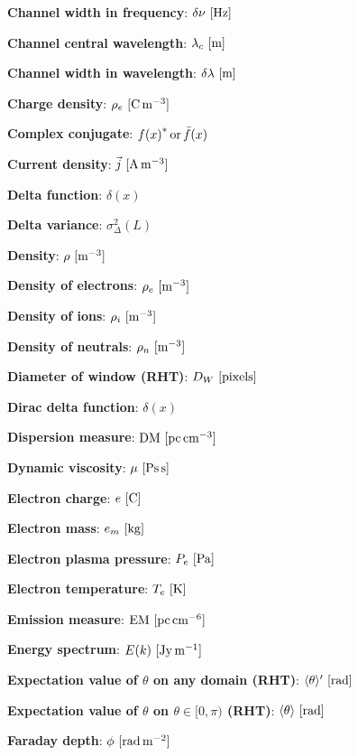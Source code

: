 \documentclass[a4paper,10pt]{article}
\begin{document}
{\noindent}\textbf{Channel width in frequency}: $\delta\nu~[{\rm Hz}]$

{\noindent}\textbf{Channel central wavelength}: $\lambda_c~[{\rm m}]$

{\noindent}\textbf{Channel width in wavelength}: $\delta\lambda~[{\rm m}]$

{\noindent}\textbf{Charge density}: $\rho_e~[{\rm C\,m^{-3}}]$

{\noindent}\textbf{Complex conjugate}: ${f(x)}^*\,{\rm or}\,\bar{f}(x)$

{\noindent}\textbf{Current density}: $\vec{j} ~ [{\rm A\,m^{-3}}]$

{\noindent}\textbf{Delta function}: $\delta (x)$

{\noindent}\textbf{Delta variance}: $\sigma_\Delta^2(L)$

{\noindent}\textbf{Density}: $\rho~[{\rm m^{-3}}]$

{\noindent}\textbf{Density of electrons}: $\rho_e~[{\rm m^{-3}}]$

{\noindent}\textbf{Density of ions}: $\rho_i~[{\rm m^{-3}}]$

{\noindent}\textbf{Density of neutrals}: $\rho_n~[{\rm m^{-3}}]$

{\noindent}\textbf{Diameter of window (RHT)}: $D_W ~ [{\rm pixels}]$

{\noindent}\textbf{Dirac delta function}: $\delta(x)$

{\noindent}\textbf{Dispersion measure}: ${\rm DM} ~ [{\rm pc\,cm^{-3}}]$

{\noindent}\textbf{Dynamic viscosity}: $\mu ~ [{\rm Ps\,s}]$

{\noindent}\textbf{Electron charge}: $e~[{\rm C}]$

{\noindent}\textbf{Electron mass}: $e_m~[{\rm kg}]$

{\noindent}\textbf{Electron plasma pressure}: $P_e~[{\rm Pa}]$

{\noindent}\textbf{Electron temperature}: $T_e~[{\rm K}]$

{\noindent}\textbf{Emission measure}: ${\rm EM} ~ [{\rm pc\,cm^{-6}}]$

{\noindent}\textbf{Energy spectrum}: $E(k)~[{\rm Jy\,m^{-1}}]$

{\noindent}\textbf{Expectation value of $\theta$ on any domain (RHT)}: $\langle\theta\rangle' ~ [{\rm rad}]$

{\noindent}\textbf{Expectation value of $\theta$ on $\theta\in[0,\pi)$ (RHT)}: $\langle\theta\rangle ~ [{\rm rad}]$

{\noindent}\textbf{Faraday depth}: $\phi~[{\rm rad\,m^{-2}}]$
\end{document}
